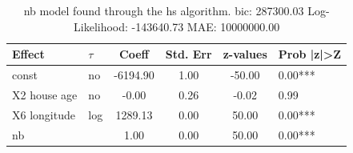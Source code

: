 \begin{table}
	\caption{nb model found through the hs algorithm. bic: 287300.03 Log-Likelihood: -143640.73 MAE: 10000000.00}
	\begin{center}
		\begin{tabular}{|l|l|c|c|c|l|}
			\hline
			Effect & $\tau$ & Coeff & Std. Err & z-values & Prob |z|>Z \\
			\hline
			const & no & -6194.90 & 1.00 & -50.00 & 0.00*** \\
			\hline
			X2 house age & no & -0.00 & 0.26 & -0.02 & 0.99 \\
			\hline
			X6 longitude & log & 1289.13 & 0.00 & 50.00 & 0.00*** \\
			\hline
			nb &  & 1.00 & 0.00 & 50.00 & 0.00*** \\
			\hline
		\end{tabular}
	\end{center}
\end{table}